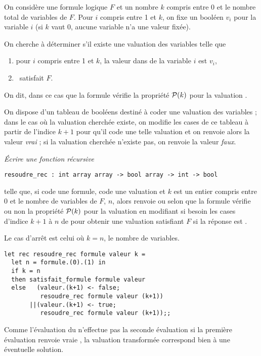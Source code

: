 On considère une formule logique $F$ et un nombre $k$ compris entre 0 et le nombre total de variables de $F$. Pour $i$ compris entre 1 et $k$, on fixe un booléen $v_i$ pour la variable $i$ (si $k$ vaut 0, aucune variable n’a une valeur fixée). 

On cherche à déterminer s’il existe une valuation \val des variables telle que
\begin{enumerate}
  \item pour $i$ compris entre 1 et $k$, la valeur dans \val de la variable $i$ est $v_i$,
  \item \val\ satisfait $F$. 
\end{enumerate}

On dit, dans ce cas que la formule vérifie la propriété ${\cal P}(k)$ pour la valuation \val.

On dispose d’un tableau de booléens destiné à coder une valuation des variables ; dans le cas où la valuation cherchée existe, on modifie les cases de ce tableau à partir de l'indice $k+1$ pour qu’il code une telle valuation et on renvoie alors la valeur {\it vrai} ; si la valuation cherchée n’existe pas, on renvoie la valeur {\it faux}.
\begin{Exercise}\it
Écrire une fonction récursive 
\begin{lstlisting}
resoudre_rec : int array array -> bool array -> int -> bool
\end{lstlisting}
telle que, si  code une formule,  code une valuation et $k$ est un entier compris entre 0 et le nombre de variables de $F$, $n$, alors  renvoie  ou  selon que la formule vérifie ou non la propriété ${\cal P}(k)$ pour la valuation \val en modifiant si besoin les cases d'indice $k+1$ à $n$ de  pour obtenir une valuation satisfiant $F$ si la réponse est .
\end{Exercise}
\begin{Answer}Le cas d'arrêt est celui où $k=n$, le nombre de variables.
\begin{lstlisting}
let rec resoudre_rec formule valeur k =
  let n = formule.(0).(1) in
  if k = n
  then satisfait_formule formule valeur
  else   (valeur.(k+1) <- false; 
          resoudre_rec formule valeur (k+1))
       ||(valeur.(k+1) <- true; 
          resoudre_rec formule valeur (k+1));;
\end{lstlisting}

Comme l'évaluation du \type{||} n'effectue pas la seconde évaluation si la première évaluation renvoie vraie , la valuation transformée correspond bien à une éventuelle solution.
\end{Answer}
